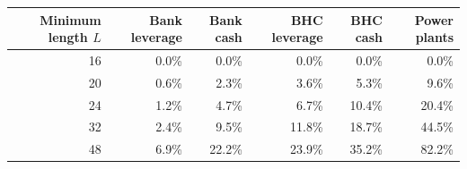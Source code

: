 \begin{tabular}{rrrrrr}
\toprule
Minimum length $L$ & Bank leverage & Bank cash & BHC leverage & BHC cash & Power plants \\
\midrule
16 & 0.0\% & 0.0\% & 0.0\% & 0.0\% & 0.0\% \\
20 & 0.6\% & 2.3\% & 3.6\% & 5.3\% & 9.6\% \\
24 & 1.2\% & 4.7\% & 6.7\% & 10.4\% & 20.4\% \\
32 & 2.4\% & 9.5\% & 11.8\% & 18.7\% & 44.5\% \\
48 & 6.9\% & 22.2\% & 23.9\% & 35.2\% & 82.2\% \\
\bottomrule
\end{tabular}
